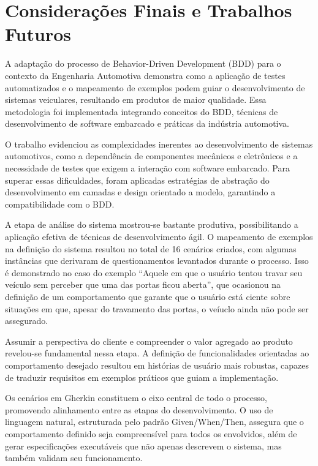 \chapter{Considerações Finais e Trabalhos Futuros}
 
A adaptação do processo de Behavior-Driven Development (BDD) para o contexto da Engenharia Automotiva demonstra como a aplicação de testes automatizados e o 
mapeamento de exemplos podem guiar o desenvolvimento de sistemas veiculares, resultando em produtos de maior qualidade. Essa metodologia foi implementada integrando 
conceitos do BDD, técnicas de desenvolvimento de software embarcado e práticas da indústria automotiva.

O trabalho evidenciou as complexidades inerentes ao desenvolvimento de sistemas automotivos, como a dependência de componentes mecânicos e eletrônicos e a necessidade 
de testes que exigem a interação com software embarcado. Para superar essas dificuldades, foram aplicadas estratégias de abstração do desenvolvimento em camadas 
e design orientado a modelo, garantindo a compatibilidade com o BDD.

A etapa de análise do sistema mostrou-se bastante produtiva, possibilitando a aplicação efetiva de técnicas de desenvolvimento ágil. O mapeamento de exemplos 
na definição do sistema resultou no total de 16 cenários criados, com algumas instâncias que derivaram de questionamentos levantados durante o processo. Isso 
é demonstrado no caso do exemplo ``Aquele em que o usuário tentou travar seu veículo sem perceber que uma das portas ficou aberta'', que ocasionou na definição 
de um comportamento que garante que o usuário está ciente sobre situações em que, apesar do travamento das portas, o veíuclo ainda não pode ser assegurado.

Assumir a perspectiva do cliente e compreender o valor agregado ao produto revelou-se fundamental nessa etapa. A definição de funcionalidades orientadas ao 
comportamento desejado resultou em histórias de usuário mais robustas, capazes de traduzir requisitos em exemplos práticos que guiam a implementação.

Os cenários em Gherkin constituem o eixo central de todo o processo, promovendo alinhamento entre as etapas do desenvolvimento. O uso de linguagem natural, estruturada 
pelo padrão Given/When/Then, assegura que o comportamento definido seja compreensível para todos os envolvidos, além de gerar especificações executáveis que não 
apenas descrevem o sistema, mas também validam seu funcionamento.

